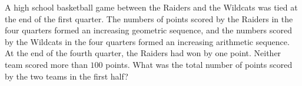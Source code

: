A high school basketball game between the Raiders and the Wildcats was tied at the end of the first quarter. The numbers of points scored by the Raiders in the four quarters formed an increasing geometric sequence, and the numbers scored by the Wildcats in the four quarters formed an increasing arithmetic sequence. At the end of the fourth quarter, the Raiders had won by one point. Neither team scored more than $100$ points. What was the total number of points scored by the two teams in the first half?
